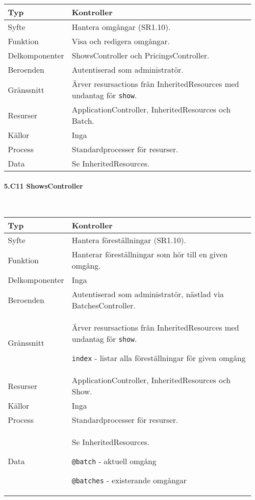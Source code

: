 \documentclass[a4paper, twoside, 11pt, titlepage]{article}
\begin{document}
			\begin {table} [ht] \begin{tabular} {  p{3.5cm} p{9.6cm} }
				\hline
				{Typ} & {Kontroller} \\
				\hline
				{Syfte} & {Hantera omgångar (SR1.10).} \\
				\hline
				{Funktion} & {Visa och redigera omgångar.} \\
				\hline
				{Delkomponenter} & {ShowsController och PricingsController.} \\
				\hline
				{Beroenden} & {Autentiserad som administratör.} \\
				\hline
				{Gränssnitt} & {Ärver resursactions från InheritedResources med undantag för {\tt show}.} \\
				\hline
				{Resurser} & {ApplicationController, InheritedResources och Batch.} \\
				\hline
				{Källor} & {Inga} \\
				\hline
				{Process} & {Standardprocesser för resurser.} \\
				\hline
				{Data} & {Se InheritedResources.} \\
				\hline
			\end{tabular} \end{table} \FloatBarrier


			\paragraph{5.C11 ShowsController}\

			\begin {table} [ht] \begin{tabular} {  p{3.5cm} p{9.6cm} }
				\hline
				{Typ} & {Kontroller} \\
				\hline
				{Syfte} & {Hantera föreställningar (SR1.10).} \\
				\hline
				{Funktion} & {Hanterar föreställningar som hör till en given omgång.} \\
				\hline
				{Delkomponenter} & {Inga} \\
				\hline
				{Beroenden} & {Autentiserad som administratör, nästlad via BatchesController.} \\
				\hline
				{Gränssnitt} & {Ärver resursactions från InheritedResources med undantag för {\tt show}.

{\tt index} - listar alla föreställningar för given omgång} \\
				\hline
				{Resurser} & {ApplicationController, InheritedResources och Show.} \\
				\hline
				{Källor} & {Inga} \\
				\hline
				{Process} & {Standardprocesser för resurser.} \\
				\hline
				{Data} & {Se InheritedResources.

{\tt @batch} - aktuell omgång

{\tt @batches} - existerande omgångar} \\
				\hline
			\end{tabular} \end{table} \FloatBarrier
\end{document}
